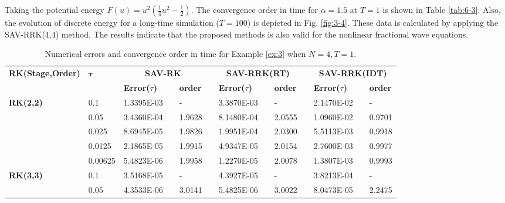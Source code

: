 \documentclass[preprint,compress,3p,10pt,fleqn]{elsarticle}
\numberwithin{equation}{section}
\begin{document}
Taking the potential energy $F(u)=u^2\left(\frac{1}{4} u^2-\frac{1}{2}\right)$. The convergence order
in time for $\alpha=1.5$ at $T=1$ is shown in Table \ref{tab:6-3}.
Also, the evolution of discrete energy for a long-time simulation ($T=100$) is depicted in Fig. \ref{fig:3-4}.
These data is calculated by applying the SAV-RRK(4,4) method. The results indicate that the proposed methods
is also valid for the nonlinear fractional wave equations.
\begin{table}[H]\footnotesize
\centering
\caption{Numerical errors and convergence order in time for Example \ref{ex:3} when $N=4, T = 1$.}
\begin{tabular}{lllllrlrlrlrlrl}
\toprule
\multicolumn{2}{l}{\multirow{2}[3]{*}{\textbf{RK(Stage,Order)}}} & \multicolumn{2}{l}{\multirow{2}[3]{*}{$\bm{\tau}$}} & \multicolumn{3}{c}{\textbf{SAV-RK}} &       & \multicolumn{3}{c}{\textbf{SAV-RRK(RT)}} &       & \multicolumn{3}{c}{\textbf{SAV-RRK(IDT)}} \\
\cmidrule{5-7}\cmidrule{9-11}\cmidrule{13-15}    \multicolumn{2}{l}{} & \multicolumn{2}{l}{} & \textbf{Error($\tau$)} &       & \textbf{order} &       & \textbf{Error($\tau$)} &       & \textbf{order} &       & \textbf{Error($\tau$)} &       & \textbf{order} \\
\hline
\multicolumn{2}{l}{\multirow{5}[0]{*}{\textbf{RK(2,2)}}} & \multicolumn{2}{l}{0.1} & 1.3395E-03 &       & -     &       & 3.3870E-03 &       & -     &       & 2.1470E-02 &       & - \\
\multicolumn{2}{l}{} & \multicolumn{2}{l}{0.05} & 3.4360E-04 &       & 1.9628  &       & 8.1480E-04 &       & 2.0555  &       & 1.0960E-02 &       & 0.9701  \\
\multicolumn{2}{l}{} & \multicolumn{2}{l}{0.025} & 8.6945E-05 &       & 1.9826  &       & 1.9951E-04 &       & 2.0300  &       & 5.5113E-03 &       & 0.9918  \\
\multicolumn{2}{l}{} & \multicolumn{2}{l}{0.0125} & 2.1865E-05 &       & 1.9915  &       & 4.9347E-05 &       & 2.0154  &       & 2.7600E-03 &       & 0.9977  \\
\multicolumn{2}{l}{} & \multicolumn{2}{l}{0.00625} & 5.4823E-06 &       & 1.9958  &       & 1.2270E-05 &       & 2.0078  &       & 1.3807E-03 &       & 0.9993  \\
\multicolumn{2}{l}{\multirow{5}[0]{*}{\textbf{RK(3,3)}}} & \multicolumn{2}{l}{0.1} & 3.5168E-05 &       & -     &       & 4.3927E-05 &       & -     &       & 3.8213E-04 &       & - \\
\multicolumn{2}{l}{} & \multicolumn{2}{l}{0.05} & 4.3533E-06 &       & 3.0141  &       & 5.4825E-06 &       & 3.0022  &       & 8.0473E-05 &       & 2.2475  \\

\end{tabular}
\end{table}
\end{document}
